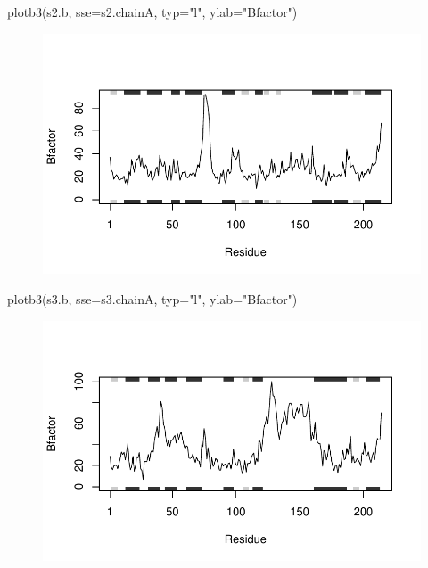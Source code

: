 \documentclass[
  letterpaper,
  DIV=11,
  numbers=noendperiod]{scrartcl}
\newenvironment{Shaded}{\begin{snugshade}}{\end{snugshade}}
\newcommand{\AttributeTok}[1]{\textcolor[rgb]{0.40,0.45,0.13}{#1}}
\newcommand{\FunctionTok}[1]{\textcolor[rgb]{0.28,0.35,0.67}{#1}}
\newcommand{\NormalTok}[1]{\textcolor[rgb]{0.00,0.23,0.31}{#1}}
\newcommand{\StringTok}[1]{\textcolor[rgb]{0.13,0.47,0.30}{#1}}
\begin{document}
\begin{Shaded}
\begin{Highlighting}[]
\FunctionTok{plotb3}\NormalTok{(s2.b, }\AttributeTok{sse=}\NormalTok{s2.chainA, }\AttributeTok{typ=}\StringTok{"l"}\NormalTok{, }\AttributeTok{ylab=}\StringTok{"Bfactor"}\NormalTok{)}
\end{Highlighting}
\end{Shaded}

\begin{figure}[H]

{\centering \includegraphics{hw6_turnin_files/figure-pdf/unnamed-chunk-1-2.pdf}

}

\end{figure}

\begin{Shaded}
\begin{Highlighting}[]
\FunctionTok{plotb3}\NormalTok{(s3.b, }\AttributeTok{sse=}\NormalTok{s3.chainA, }\AttributeTok{typ=}\StringTok{"l"}\NormalTok{, }\AttributeTok{ylab=}\StringTok{"Bfactor"}\NormalTok{) }
\end{Highlighting}
\end{Shaded}

\begin{figure}[H]

{\centering \includegraphics{hw6_turnin_files/figure-pdf/unnamed-chunk-1-3.pdf}

}

\end{figure}
\end{document}

